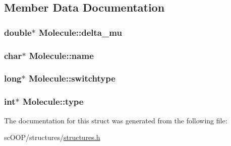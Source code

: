 \subsection{Member Data Documentation}
\hypertarget{struct_molecule_a6fd83a87d28a34e7098dc9d9f22b6c41}{
\subsubsection[{delta\+\_\+mu}]{\setlength{\rightskip}{0pt plus 5cm}double$\ast$ Molecule\+::delta\+\_\+mu}}\label{struct_molecule_a6fd83a87d28a34e7098dc9d9f22b6c41}
\hypertarget{struct_molecule_a905da45fb2ad1c821b7cf03c655c3047}{
\subsubsection[{name}]{\setlength{\rightskip}{0pt plus 5cm}char$\ast$ Molecule\+::name}}\label{struct_molecule_a905da45fb2ad1c821b7cf03c655c3047}
\hypertarget{struct_molecule_acf6cf0f43a015cff8dde7970e1ca3abd}{
\subsubsection[{switchtype}]{\setlength{\rightskip}{0pt plus 5cm}long$\ast$ Molecule\+::switchtype}}\label{struct_molecule_acf6cf0f43a015cff8dde7970e1ca3abd}
\hypertarget{struct_molecule_aa968965732a78fc8b2b60fc27d6374b6}{
\subsubsection[{type}]{\setlength{\rightskip}{0pt plus 5cm}int$\ast$ Molecule\+::type}}\label{struct_molecule_aa968965732a78fc8b2b60fc27d6374b6}


The documentation for this struct was generated from the following file\+:\begin{DoxyCompactItemize}
\item 
sc\+O\+O\+P/structures/\hyperlink{structures_8h}{structures.\+h}\end{DoxyCompactItemize}
